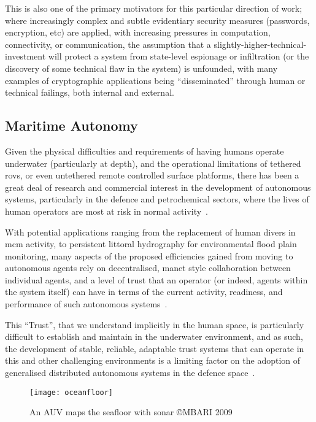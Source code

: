This is also one of the primary motivators for this particular direction of work; where increasingly complex and subtle evidentiary security measures (passwords, encryption, etc) are applied, with increasing pressures in computation, connectivity, or communication, the assumption that a slightly-higher-technical-investment will protect a system from state-level espionage or infiltration (or the discovery of some technical flaw in the system) is unfounded, with many examples of cryptographic applications being ``disseminated'' through human or technical failings, both internal and external. 

\subsection{Maritime Autonomy}

Given the physical difficulties and requirements of having humans operate underwater (particularly at depth), and the operational limitations of tethered \glspl{rov}, or even untethered remote controlled surface platforms, there has been a great deal of research and commercial interest in the development of autonomous systems, particularly in the defence and petrochemical sectors, where the lives of human operators are most at risk in normal activity~\cite{Pechoucek:2008:DIA:1355335}.

With potential applications ranging from the replacement of human divers in \gls{mcm} activity, to persistent littoral hydrography for environmental flood plain monitoring, many aspects of the proposed efficiencies gained from moving to autonomous agents rely on decentralised, \gls{manet} style collaboration between individual agents, and a level of trust that an operator (or indeed, agents within the system itself) can have in terms of the current activity, readiness, and performance of such autonomous systems~\cite{Wynn2014}.

This ``Trust'', that we understand implicitly in the human space, is particularly difficult to establish and maintain in the underwater environment, and as such, the development of stable, reliable, adaptable trust systems that can operate in this and other challenging environments is a limiting factor on the adoption of generalised distributed autonomous systems in the defence space~\cite{Caseley2009}.

\begin{figure}[h]
	\centering
	\texttt{[image: oceanfloor]}
	\caption{An AUV maps the seafloor with sonar \copyright MBARI 2009}
\end{figure}

